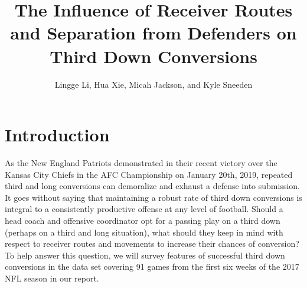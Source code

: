 \documentclass[12pt,letterpaper]{article}
\title{The Influence of Receiver Routes and Separation from Defenders on Third Down Conversions}
\author{Lingge Li, Hua Xie, Micah Jackson, and Kyle Sneeden}
\begin{document}

\maketitle

\section*{Introduction}

As the New England Patriots demonstrated in their recent victory over the Kansas City Chiefs in the AFC Championship on January 20th, 2019, repeated third and long conversions can demoralize and exhaust a defense into submission. It goes without saying that maintaining a robust rate of third down conversions is integral to a consistently productive offense at any level of football. Should a head coach and offensive coordinator opt for a passing play on a third down (perhaps on a third and long situation), what should they keep in mind with respect to receiver routes and movements to increase their chances of conversion? To help answer this question, we will survey features of successful third down conversions in the data set covering 91 games from the first six weeks of the 2017 NFL season in our report.
\end{document}
